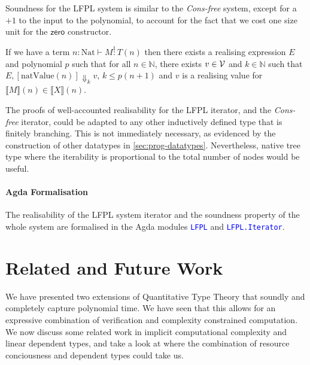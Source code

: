 \documentclass[acmsmall,screen]{acmart}
\newcommand{\tyNat}{\mathrm{Nat}}
\newcommand{\conZero}{\mathsf{zero}}
\newcommand{\AgdaModule}[1]{\textcolor{blue}{\tt #1}}
\begin{document}
Soundness for the LFPL system is similar to the \emph{Cons-free}
system, except for a $+1$ to the input to the polynomial, to account
for the fact that we cost one size unit for the $\conZero$
constructor.
\begin{theorem}
  \label{thm:lfpl-soundness}
  If we have a term $n : \tyNat \vdash M \stackrel1: T(n)$ then there
  exists a realising expression $E$ and polynomial $p$ such that for
  all $n \in \mathbb{N}$, there exists $v \in \mathcal{V}$ and
  $k \in \mathbb{N}$ such that
  $E, [\mathrm{natValue}(n)] \Downarrow_k v$, $k \leq p(n+1)$ and $v$
  is a realising value for
  $\llbracket M \rrbracket(n) \in \llbracket X \rrbracket(n)$.
\end{theorem}

The proofs of well-accounted realisability for the LFPL iterator, and
the \emph{Cons-free} iterator, could be adapted to any other
inductively defined type that is finitely branching. This is not
immediately necessary, as evidenced by the construction of other
datatypes in \autoref{sec:prog-datatypes}. Nevertheless, native tree
type where the iterability is proportional to the total number of
nodes would be useful.

\paragraph{Agda Formalisation} The realisability of the LFPL system
iterator and the soundness property of the whole system are formalised
in the Agda modules \AgdaModule{LFPL} and \AgdaModule{LFPL.Iterator}.

\section{Related and Future Work}
\label{sec:conclusion}

We have presented two extensions of Quantitative Type Theory that
soundly and completely capture polynomial time. We have seen that this
allows for an expressive combination of verification and complexity
constrained computation. We now discuss some related work in implicit
computational complexity and linear dependent types, and take a look
at where the combination of resource conciousness and dependent types
could take us.
\end{document}
